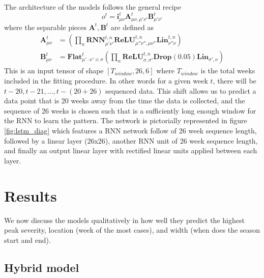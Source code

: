 \documentclass[12pt,a4paper,english]{article}
\begin{document}
The architecture of the models follows the general recipe
\begin{equation}
o^t = \mathbf{i}^t_{\mu\nu}\mathbf{A}^{t}_{\mu\nu,\mu'\nu'}\mathbf{B}^{t}_{\mu'\nu'}
\end{equation}
where the separable pieces $\mathbf{A}^t,\mathbf{B}^t$ are defined as 
\begin{align}
\mathbf{A}^t_{\mu\nu} &=\left(\prod_{n} \mathbf{RNN}^{t,n}_{\mu'\nu'}\mathbf{ReLU}^{t,n}_{\mu''\nu'',\mu\nu''}\mathbf{Lin}^{t,n}_{\nu''\nu}\right)\\
\mathbf{B}^t_{\mu\nu} &=\mathbf{Flat}^t_{\mu'\cdot\nu' \equiv \sigma} \left(\prod_n\mathbf{ReLU}^{t,n}_{\sigma,\sigma'}\mathbf{Drop(0.05)}\mathbf{Lin}_{\sigma',\nu}\right)
\end{align}
This is an input tensor of shape $[T_{window},26,6]$ where $T_{window}$ is the total weeks included in the fitting procedure. In other words for a given week $t$, there will be $t-20,t-21,...,t-(20+26)$ sequenced data. This shift allows us to predict a data point that is 20 weeks away from the time the data is collected, and the sequence of 26 weeks is chosen such that is a sufficiently long enough window for the RNN to learn the pattern. The network is pictorially represented in figure \ref{fig:lstm_diag} which features a RNN network follow of 26 week sequence length, followed by a linear layer (26x26), another RNN unit of 26 week sequence length, and finally an output linear layer with rectified linear units applied between each layer.


	
\section{Results}
We now discuss the models qualitatively in how well they predict the highest peak severity, location (week of the most cases), and width (when does the season start and end).
\subsection{Hybrid model}
\end{document}
